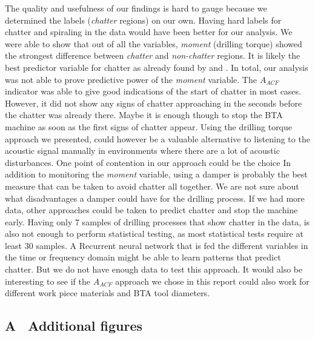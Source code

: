 \documentclass[12 pt]{scrartcl}
\begin{document}
The quality and usefulness of our findings is hard to gauge because we determined the labels (\emph{chatter} regions) on our own. Having hard labels for chatter and spiraling in the data would have been better for our analysis. We were able to show that out of all the variables, \emph{moment} (drilling torque) showed the strongest difference between \emph{chatter} and \emph{non-chatter} regions. It is likely the best predictor variable for chatter as already found by \citet{deistler2022time} and \citep[p.~27]{theis2004modelling}.
In total, our analysis was not able to prove predictive power of the \emph{moment} variable. The $A_{ACF}$ indicator was able to give good indications of the start of chatter in most cases. However, it did not show any signs of chatter approaching in the seconds before the chatter was already there. Maybe it is enough though to stop the BTA machine as soon as the first signs of chatter appear. Using the drilling torque approach we presented, could however be a valuable alternative to listening to the acoustic signal manually in environments where there are a lot of acoustic disturbances. One point of contention in our approach could be the choice
In addition to monitoring the \emph{moment} variable, using a damper is probably the best measure that can be taken to avoid chatter all together. We are not sure about what disadvantages a damper could have for the drilling process. If we had more data, other approaches could be taken to predict chatter and stop the machine early. Having only 7 samples of drilling processes that show chatter in the data, is also not enough to perform statistical testing, as most statistical tests require at least 30 samples. A Recurrent neural network that is fed the different variables in the time or frequency domain might be able to learn patterns that predict chatter. But we do not have enough data to test this approach.
It would also be interesting to see if the $A_{ACF}$ approach we chose in this report could also work for different work piece materials and BTA tool diameters.

\newpage
{}
\renewcommand\refname{Bibliography}


\newpage
\appendix
{}
\subsection*{A \ Additional figures}
\end{document}
